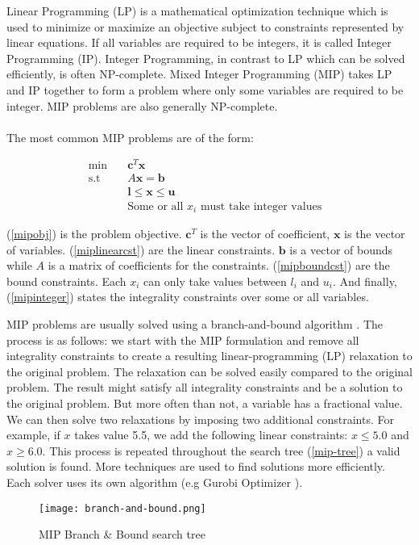 \documentclass[../../thesis.tex]{subfiles}
\begin{document}
Linear Programming (LP) is a mathematical optimization technique which is used to minimize or maximize 
an objective subject to constraints represented by linear equations. 
If all variables are required to be integers, it is called Integer Programming (IP). 
Integer Programming, in contrast to LP which can be solved efficiently, is often NP-complete.  
Mixed Integer Programming (MIP) takes LP and IP together to form a problem where only some variables 
are required to be integer. MIP problems are also generally NP-complete.

\paragraph{}

The most common MIP problems are of the form:

\begin{align}
  \textrm{min} \quad & \bm{c}^T\bm{x} & \label{mipobj} \\ 
  \textrm{s.t} \quad & A\bm{x} = \bm{b} & \label{miplinearcst} \\
   & \bm{l} \leq \bm{x} \leq \bm{u} & \label{mipboundcst} \\
   & \text{Some or all $x_i$ must take integer values} \label{mipinteger}
\end{align}

(\ref{mipobj}) is the problem objective. $\bm{c}^T$ is the vector of coefficient, $\bm{x}$ is the vector of variables.
(\ref{miplinearcst}) are the linear constraints. $\bm{b}$ is a vector of bounds while $A$ is a matrix of coefficients for the constraints.
(\ref{mipboundcst}) are the bound constraints. Each $x_i$ can only take values between $l_i$ and $u_i$.
And finally, (\ref{mipinteger}) states the integrality constraints over some or all variables.


MIP problems are usually solved using a branch-and-bound algorithm \cite{mip-basics}.
The process is as follows: we start with the MIP formulation and remove all integrality constraints 
to create a resulting linear-programming (LP) relaxation to the original problem. The relaxation can be solved 
easily compared to the original problem. The result might satisfy all integrality constraints and be a solution to the original problem.
But more often than not, a variable has a fractional value.
We can then solve two relaxations by imposing two additional constraints. For example, if $x$ takes value 5.5, we add the 
following linear constraints: $x \leq 5.0$ and $x \geq 6.0$. 
This process is repeated throughout the search tree (\autoref{mip-tree}) a valid solution is found.
More techniques are used to find solutions more efficiently. Each solver uses its
own algorithm (e.g Gurobi Optimizer \cite{mip-basics}).

\begin{figure}
  \centering
  \texttt{[image: branch-and-bound.png]}
  \caption{MIP Branch \& Bound search tree \cite{mip-basics}}
  \label{mip-tree}
\end{figure}
\end{document}
